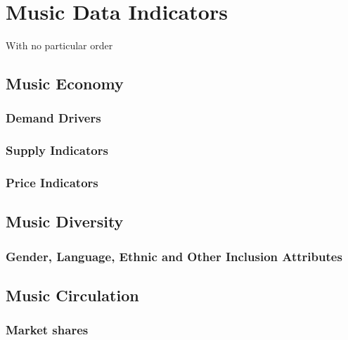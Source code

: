 \documentclass[
  a4paper,
  openany, a4paper, oneside]{book}
\begin{document}
\hypertarget{music-data}{%
\chapter{Music Data Indicators}\label{music-data}}

With no particular order

\hypertarget{music-economy}{%
\section{Music Economy}\label{music-economy}}

\hypertarget{demand-drivers}{%
\subsection{Demand Drivers}\label{demand-drivers}}

\hypertarget{supply-indicators}{%
\subsection{Supply Indicators}\label{supply-indicators}}

\hypertarget{price-indicators}{%
\subsection{Price Indicators}\label{price-indicators}}

\hypertarget{music-diversity}{%
\section{Music Diversity}\label{music-diversity}}

\hypertarget{gender-language-ethnic-and-other-inclusion-attributes}{%
\subsection{Gender, Language, Ethnic and Other Inclusion Attributes}\label{gender-language-ethnic-and-other-inclusion-attributes}}

\hypertarget{music-circulation}{%
\section{Music Circulation}\label{music-circulation}}

\hypertarget{market-shares}{%
\subsection{Market shares}\label{market-shares}}
\end{document}
